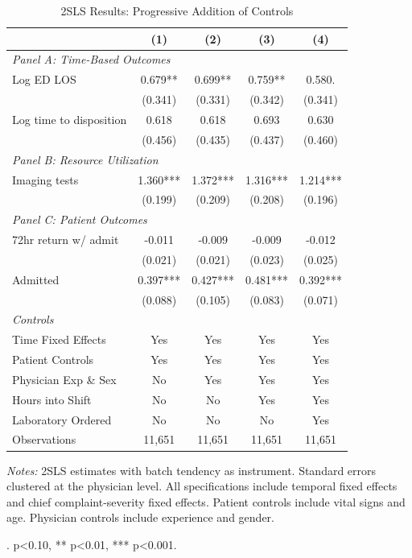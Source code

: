 \documentclass[11pt]{article}
\newcommand{\1}{\hbox{\rm 1\kern-.35em 1}}
\begin{document}
\begin{table}[H]
\centering
\caption*{2SLS Results: Progressive Addition of Controls}
\begin{threeparttable}
\small
\begin{tabular}{lcccc}
\toprule
& (1) & (2) & (3) & (4) \\
\midrule
\multicolumn{4}{l}{\textit{Panel A: Time-Based Outcomes}} \\[0.5em]
Log ED LOS & 0.679** & 0.699** & 0.759**  & 0.580. \\
& (0.341) & (0.331) & (0.342)  & (0.341) \\[0.5em]
Log time to disposition & 0.618 & 0.618 & 0.693 & 0.630 \\
& (0.456) & (0.435) & (0.437)  & (0.460) \\[0.5em]

\multicolumn{4}{l}{\textit{Panel B: Resource Utilization}} \\[0.5em]
Imaging tests & 1.360*** & 1.372*** & 1.316***  & 1.214*** \\
& (0.199) & (0.209) & (0.208) & (0.196) \\[0.5em]

\multicolumn{4}{l}{\textit{Panel C: Patient Outcomes}} \\[0.5em]
72hr return w/ admit & -0.011 & -0.009 & -0.009  & -0.012 \\
& (0.021) & (0.021) & (0.023) & (0.025) \\[0.5em]
Admitted & 0.397*** & 0.427*** & 0.481***  & 0.392*** \\
& (0.088) & (0.105) & (0.083)  & (0.071) \\
\midrule
\textit{Controls} \\
Time Fixed Effects & Yes & Yes & Yes & Yes \\
Patient Controls & Yes & Yes & Yes & Yes \\
Physician Exp \& Sex & No & Yes & Yes & Yes \\
Hours into Shift & No & No & Yes & Yes \\
Laboratory Ordered & No & No & No & Yes \\
\midrule
Observations & 11,651 & 11,651 & 11,651 & 11,651 \\
\bottomrule
\end{tabular}
\begin{tablenotes}
\footnotesize
\item \textit{Notes:} 2SLS estimates with batch tendency as instrument. Standard errors clustered at the physician level. All specifications include temporal fixed effects and chief complaint-severity fixed effects. Patient controls include vital signs and age. Physician controls include experience and gender. 
\item . p<0.10, ** p<0.01, *** p<0.001.
\end{tablenotes}
\end{threeparttable}
\end{table}
\end{document}
